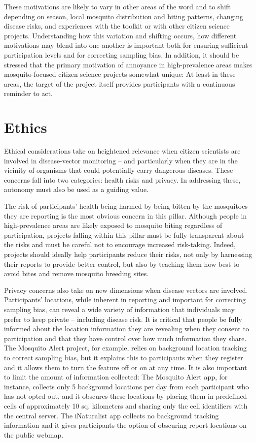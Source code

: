 \documentclass[]{article}
\begin{document}
These motivations are likely to vary in other areas of the word and to shift depending on season, local mosquito distribution and biting patterns, changing disease risks, and experiences with the toolkit or with other citizen science projects. Understanding how this variation and shifting occurs, how different motivations may blend into one another is important both for ensuring sufficient participation levels and for correcting sampling bias. In addition, it should be stressed that the primary motivation of annoyance in high-prevalence areas makes mosquito-focused citizen science projects somewhat unique: At least in these areas, the target of the project itself provides participants with a continuous reminder to act.

\hypertarget{ethics}{%
\section{Ethics}\label{ethics}}

Ethical considerations take on heightened relevance when citizen scientists are involved in disease-vector monitoring -- and particularly when they are in the vicinity of organisms that could potentially carry dangerous diseases. These concerns fall into two categories: health risks and privacy. In addressing these, autonomy must also be used as a guiding value.

The risk of participants' health being harmed by being bitten by the mosquitoes they are reporting is the most obvious concern in this pillar. Although people in high-prevalence areas are likely exposed to mosquito biting regardless of participation, projects falling within this pillar must be fully transparent about the risks and must be careful not to encourage increased risk-taking. Indeed, projects should ideally help participants reduce their risks, not only by harnessing their reports to provide better control, but also by teaching them how best to avoid bites and remove mosquito breeding sites.

Privacy concerns also take on new dimensions when disease vectors are involved. Participants' locations, while inherent in reporting and important for correcting sampling bias, can reveal a wide variety of information that individuals may prefer to keep private -- including disease risk. It is critical that people be fully informed about the location information they are revealing when they consent to participation and that they have control over how much information they share. The Mosquito Alert project, for example, relies on background location tracking to correct sampling bias, but it explains this to participants when they register and it allows them to turn the feature off or on at any time. It is also important to limit the amount of information collected: The Mosquito Alert app, for instance, collects only 5 background locations per day from each participant who has not opted out, and it obscures these locations by placing them in predefined cells of approximately 10 sq. kilometers and sharing only the cell identifiers with the central server. The iNaturalist app collects no background tracking information and it gives participants the option of obscuring report locations on the public webmap.
\end{document}
